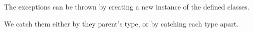 \documentclass{KodeBook}
\begin{document}


The exceptions can be thrown by creating a new instance of the defined classes. 



We catch them either by they parent's type, or by catching each type apart. 



%
%
%
%
%
%
%
%
%
%
%
%
%
%
%
%
%
%
%
%
%




\ifx\wholebook\relax\else
% 
% 
	
\end{document}
